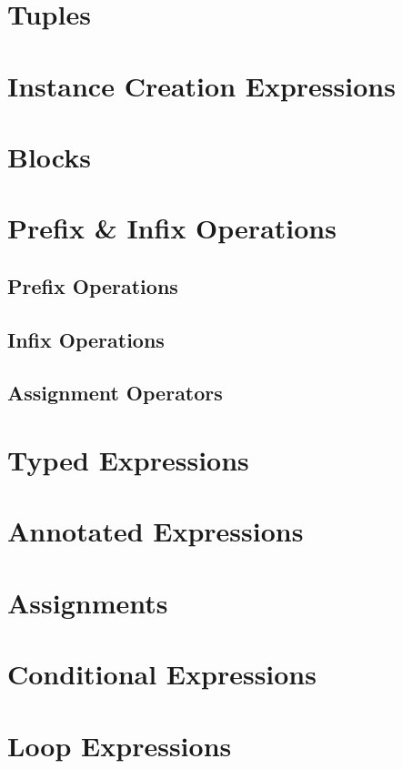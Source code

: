 \section{Tuples}

\section{Instance Creation Expressions}

\section{Blocks}

\section{Prefix \& Infix Operations}

\subsection{Prefix Operations}

\subsection{Infix Operations}

\subsection{Assignment Operators}

\section{Typed Expressions}

\section{Annotated Expressions}
\label{sec:annotated-exprs}

\section{Assignments}

\section{Conditional Expressions}

\section{Loop Expressions}

